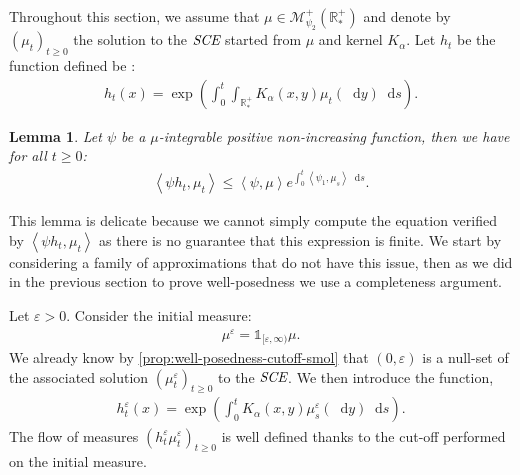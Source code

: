 \documentclass[11pt,a4paper]{article}
\newcommand{\RRP}{\mathbb{R}^+_*}
\newcommand{\MC}{\mathcal{M}}
\newcommand{\SCE}{\emph{SCE}}
\newcommand{\Proc}[1]{\left(#1\right)_{t\geq 0}}
\newcommand{\brac}[1]{\left\langle#1\right\rangle}
\newcommand{\dd}{\mathop{}\!\mathrm{d}}
\newtheorem{lemma}[theorem]{Lemma}
\begin{document}
Throughout this section, we assume that $\mu \in \MC^+_{\psi_2}(\RRP)$ and denote by $\Proc{\mu_t}$ the solution to the $\SCE$ started from $\mu$ and kernel $K_\alpha$. Let $h_t$ be the function defined be :
\begin{align*}
    h_t(x) = \exp\left(\int_0^t\int_{\RRP} K_\alpha(x,y) \mu_t(\dd y)\dd s\right).
\end{align*}
\begin{lemma}\label{lem:exponential-moments}
    Let $\psi$ be a $\mu$-integrable positive non-increasing function, then we have for all $t \geq 0$:
    \begin{align*}
        \brac{\psi h_t,\mu_t} \leq \brac{\psi,\mu}e^{\int_0^t \brac{\psi_1,\mu_s}\dd s} .
    \end{align*}
\end{lemma}
This lemma is delicate because we cannot simply compute the equation verified by $\brac{\psi h_t,\mu_t}$ as there is no guarantee that this expression is finite. We start by considering a family of approximations that do not have this issue, then as we did in the previous section to prove well-posedness we use a completeness argument.

Let $\varepsilon > 0$. Consider the initial measure:
\begin{align*}
    \mu^\varepsilon = \mathds{1}_{[\varepsilon,\infty)}\mu.
\end{align*}
We already know by \ref{prop:well-posedness-cutoff-smol} that $(0,\varepsilon)$ is a null-set of the associated solution $\Proc{\mu_t^\varepsilon}$ to the $\SCE$. We then introduce the function,
\begin{align*}
    h_t^\varepsilon(x) = \exp{\left(\int_0^t K_\alpha(x,y)\mu_s^\varepsilon(\dd y) \dd s \right)}.
\end{align*}
The flow of measures $\Proc{h_t^\varepsilon\mu_t^\varepsilon}$ is well defined thanks to the cut-off performed on the initial measure.
\end{document}
